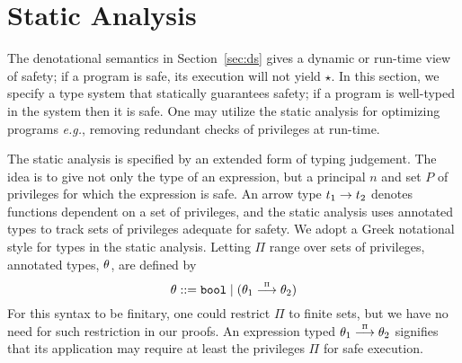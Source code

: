 \documentclass[submission,copyright,creativecommons]{eptcs}
\newcommand{\eg}{{\em e.g.}}
\newcommand{\BOOL}{\mbox{\texttt{bool}}}
\def\lpields#1{\stackrel{#1}{\longrightarrow}}
\newcommand{\annoto}[1]{\lpields {\scriptscriptstyle #1}}
\newcommand{\n}{n} \newcommand{\p}{p} \newcommand{\Ps}{\Pi} \newcommand{\h}{h}
\begin{document}
\section{Static Analysis}
\label{sec:sa}
The denotational semantics in Section~\ref{sec:ds} gives a dynamic or run-time
view of safety; if a program is safe, its execution will not yield $\star$.
In this section, we specify a type system that statically 
guarantees safety; if a program is well-typed in the system then it is safe. 
One may utilize the static analysis for optimizing programs \eg, 
removing redundant checks of privileges at run-time.

The static analysis is specified by an extended form of typing judgement.
The idea is to give not only the type of an expression, but a
principal $\n$ and set $P$ of privileges for which the expression is
safe.  An arrow type $t_1\to t_2$ denotes functions dependent on a
set of privileges, and the static analysis uses annotated types to
track sets of privileges adequate for safety.  We adopt a Greek
notational style for types in the static analysis.  Letting $\Ps$
range over sets of privileges, annotated types, $\theta$, are defined by
\[ \th ::= \BOOL \mid (\th_1\annoto{\Ps}\th_2) \]
For this syntax to be finitary, one could restrict $\Ps$ to finite sets, 
but we have no need for such restriction in our proofs.  
An expression typed $\th_1\annoto{\Ps}\th_2$
signifies that its application may require at least the privileges $\Ps$ 
for safe execution.
\end{document}
